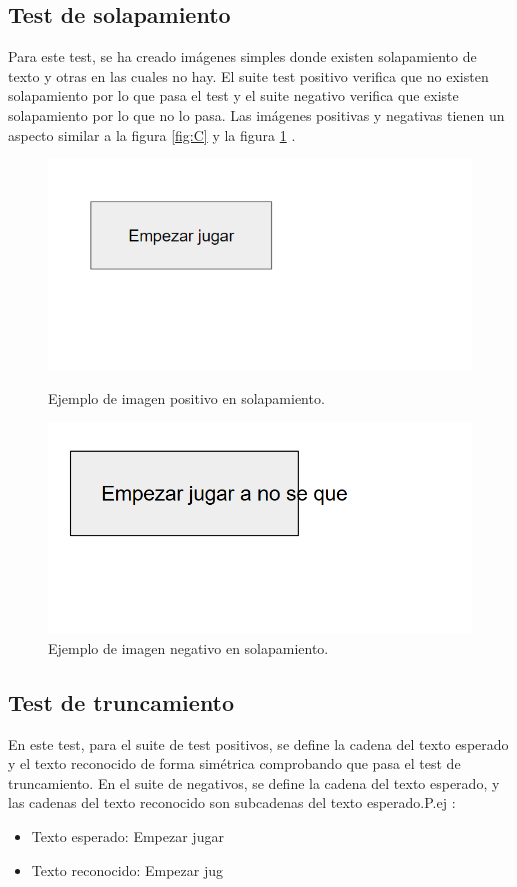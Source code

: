 \subsection{Test de solapamiento}
Para este test, se ha creado imágenes simples donde existen solapamiento de texto y otras en las cuales no hay. El suite test positivo verifica que no existen solapamiento por lo que pasa el test y el suite negativo verifica que existe solapamiento por lo que no lo pasa.
Las imágenes positivas y negativas tienen un aspecto similar a la figura \ref{fig:C} y la figura \ref{fig:F} .
\begin{figure}[H]
	\centering
	\begin{minipage}{0.45\textwidth}
		\centering
		\includegraphics[width=\linewidth]{Imagenes/Eva/C.png}
		\caption{Ejemplo de imagen positivo en solapamiento.}
		\label{fig:C}
	\end{minipage}
	\hfill
	\begin{minipage}{0.45\textwidth}
		\centering
		\includegraphics[width=\linewidth]{Imagenes/Eva/F.png}
		\caption{Ejemplo de imagen negativo en solapamiento.}
		\label{fig:F}
	\end{minipage}
\end{figure}
\subsection{Test de truncamiento}
En este test, para el suite de test positivos, se define la cadena del texto esperado y el texto reconocido de forma simétrica comprobando que pasa el test de truncamiento. En el suite de negativos, se define la cadena del texto esperado, y las cadenas del texto reconocido son subcadenas del texto esperado.P.ej :
\begin{itemize}
	\item Texto esperado: Empezar jugar
	\item Texto reconocido: Empezar jug
\end{itemize}
